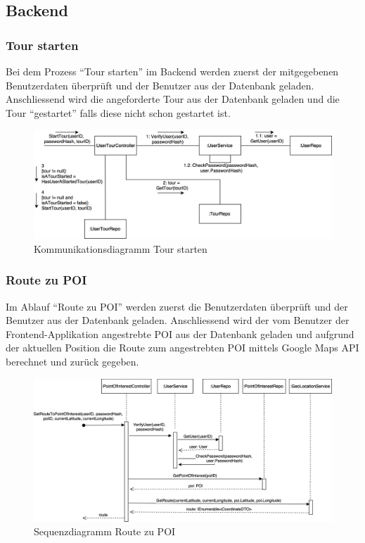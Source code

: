 \documentclass[a4paper,10pt,xetex]{article}
\begin{document}
\subsection{Backend}\label{backend}

\subsubsection{Tour starten}
Bei dem Prozess ``Tour starten'' im Backend werden zuerst der mitgegebenen Benutzerdaten
überprüft und der Benutzer aus der Datenbank geladen. Anschliessend wird die angeforderte
Tour aus der Datenbank geladen und die Tour ``gestartet'' falls diese nicht schon gestartet ist.

\begin{figure}
  \includegraphics{Kommunikationsdiagramm_StartTour}
  \caption{Kommunikationsdiagramm Tour starten}
\end{figure}

\subsubsection{Route zu POI}
Im Ablauf ``Route zu POI'' werden zuerst die Benutzerdaten überprüft und der Benutzer aus
der Datenbank geladen. Anschliessend wird der vom Benutzer der Frontend-Applikation angestrebte
POI aus der Datenbank geladen und aufgrund der aktuellen Position die Route zum angestrebten
POI mittels Google Maps API berechnet und zurück gegeben.

\begin{figure}
  \includegraphics{Sequenzdiagramm_GetRouteToPoi}
  \caption{Sequenzdiagramm Route zu POI}
\end{figure}
\end{document}
